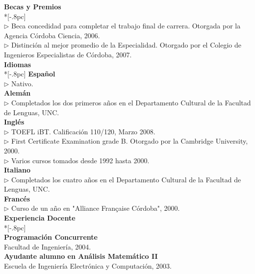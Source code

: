 \documentclass[a4paper,11pt,english]{article}
\begin{document}
{\bf Becas y Premios} \\*[-.8pc]
\underline{\hspace{6in}} \\
$\triangleright$ Beca concedidad para completar el trabajo final de carrera.
Otorgada por la Agencia C\'ordoba Ciencia, 2006.\\ 
$\triangleright$ Distinci\'on al mejor promedio de la Especialidad.
Otorgado por el Colegio de Ingenieros Especialistas de C\'ordoba, 2007.\\

{\large \bf Idiomas} \\*[-.8pc]
\underline{\hspace{6in}}
{\bf Espa\~{n}ol}\\
$\triangleright$ Nativo.\\
{\bf Alem\'an}\\
$\triangleright$ Completados los dos primeros a\~{n}os en el Departamento Cultural de la Facultad de Lenguas, UNC. \\
{\bf Ingl\'es}\\
$\triangleright$ TOEFL iBT. Calificaci\'on 110/120, Marzo 2008.\\
$\triangleright$ First Certificate Examination grade B. Otorgado por la  Cambridge University, 2000.\\
$\triangleright$ Varios cursos tomados desde 1992 hasta 2000.\\
{\bf Italiano}\\
$\triangleright$ Completados los cuatro a\~{n}os en el Departamento Cultural de la Facultad de Lenguas, UNC. 
\\
{\bf Franc\'es}\\
$\triangleright$ Curso de un a\~{n}o en "Alliance Fran\c caise C\'ordoba", 2000.
\\



{\large \bf Experiencia Docente} \\*[-.8pc]
\underline{\hspace{6in}} \\
{\bf Programaci\'on Concurrente}\\
Facultad de Ingenier\'ia, 2004.
\\
{\bf Ayudante alumno en An\'alisis Matem\'atico II}\\
Escuela de Ingenier\'ia Electr\'onica y Computaci\'on, 2003.
\\
\end{document}
